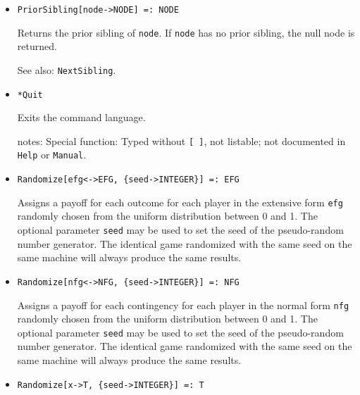 \begin{itemize}
\item
\protect \large \begin{verbatim}
PriorSibling[node->NODE] =: NODE
\end{verbatim}\normalsize

\bd
Returns the prior sibling of \verb+node+.  If \verb+node+ has
no prior sibling, the null node is returned.
\item [See also:] \verb+NextSibling+.
\ed




\item
\protect \large \begin{verbatim}
*Quit
\end{verbatim}\normalsize

\bd
Exits the command language.  
\item [notes:] Special function:  Typed without \verb+[ ]+, not
listable; not documented in \verb+Help+ or \verb+Manual+.  
\ed


\item
\protect \large \begin{verbatim}
Randomize[efg<->EFG, {seed->INTEGER}] =: EFG
\end{verbatim}\normalsize

\bd
Assigns a payoff for each outcome for each player in the
extensive form \verb+efg+ randomly chosen from the uniform distribution
between 0 and 1.  The optional parameter \verb+seed+ may be used to
set the seed of the pseudo-random number generator.  The identical game
randomized with the same seed on the same machine will always produce
the same results.
\ed

\item
\protect \large \begin{verbatim}
Randomize[nfg<->NFG, {seed->INTEGER}] =: NFG
\end{verbatim}\normalsize

\bd
Assigns a payoff for each contingency for each player in
the normal form \verb+nfg+ randomly chosen from the uniform distribution
between 0 and 1.  The optional parameter \verb+seed+ may be used to
set the seed of the pseudo-random number generator.  The identical game
randomized with the same seed on the same machine will always produce
the same results.
\ed

\item
\protect \large \begin{verbatim}
Randomize[x->T, {seed->INTEGER}] =: T
\end{verbatim}\normalsize


\end{itemize}
